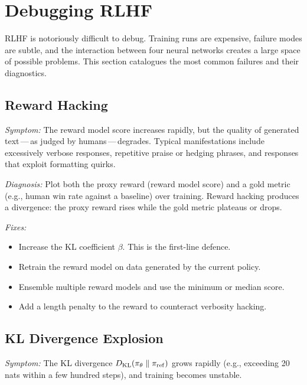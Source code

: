 \section{Debugging RLHF}
\label{sec:debugging-rlhf}

RLHF is notoriously difficult to debug. Training runs are expensive, failure modes are subtle, and the interaction between four neural networks creates a large space of possible problems. This section catalogues the most common failures and their diagnostics.

\subsection{Reward Hacking}

\emph{Symptom:} The reward model score increases rapidly, but the quality of generated text\,---\,as judged by humans\,---\,degrades. Typical manifestations include excessively verbose responses, repetitive praise or hedging phrases, and responses that exploit formatting quirks.

\emph{Diagnosis:} Plot both the proxy reward (reward model score) and a gold metric (e.g., human win rate against a baseline) over training. Reward hacking produces a divergence: the proxy reward rises while the gold metric plateaus or drops.

\emph{Fixes:}
\begin{itemize}[leftmargin=*]
  \item Increase the KL coefficient $\beta$. This is the first-line defence.
  \item Retrain the reward model on data generated by the current policy.
  \item Ensemble multiple reward models and use the minimum or median score.
  \item Add a length penalty to the reward to counteract verbosity hacking.
\end{itemize}

\subsection{KL Divergence Explosion}

\emph{Symptom:} The KL divergence $D_{\mathrm{KL}}\!\left(\pi_\theta\;\|\;\pi_{\mathrm{ref}}\right)$ grows rapidly (e.g., exceeding 20 nats within a few hundred steps), and training becomes unstable.

